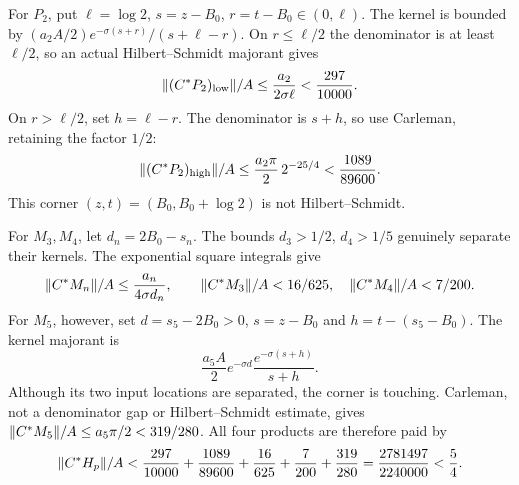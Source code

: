 \documentclass[11pt,a4paper]{article}
\numberwithin{equation}{section}
\theoremstyle{definition}\newtheorem{definition}[theorem]{Definition}
\theoremstyle{remark}\newtheorem{remark}[theorem]{Remark}
\begin{document}
For $P_2$, put $\ell=\log2$, $s=z-{B_0}$, $r=t-{B_0}\in(0,\ell)$.
The kernel is bounded by
$(a_2A/2)e^{-\sigma(s+r)}/(s+\ell-r)$.
On $r\le\ell/2$ the denominator is at least $\ell/2$, so an actual Hilbert--Schmidt majorant gives
\[
 \lVert(C^*P_2)_{\rm low}\rVert/A
 \le\frac{a_2}{2\sigma\ell}<\frac{297}{10000}.
\]
On $r>\ell/2$, set $h=\ell-r$. The denominator is $s+h$, so use Carleman, retaining the factor $1/2$:
\[
 \lVert(C^*P_2)_{\rm high}\rVert/A
 \le\frac{a_2\pi}{2}\,2^{-25/4}<\frac{1089}{89600}.
\]
This corner $(z,t)=({B_0},{B_0}+\log2)$ is not Hilbert--Schmidt.

For $M_3,M_4$, let $d_n=2{B_0}-s_n$. The bounds
$d_3>1/2$, $d_4>1/5$ genuinely separate their kernels.
The exponential square integrals give
\[
 \lVert C^*M_n\rVert/A\le\frac{a_n}{4\sigma d_n},\qquad
 \lVert C^*M_3\rVert/A<16/625,\quad \lVert C^*M_4\rVert/A<7/200.
\]
For $M_5$, however, set $d=s_5-2{B_0}>0$,
$s=z-{B_0}$ and $h=t-(s_5-{B_0})$.
The kernel majorant is
\[
 \frac{a_5A}{2}e^{-\sigma d}\frac{e^{-\sigma(s+h)}}{s+h}.
\]
Although its two input locations are separated, the corner is touching.
Carleman, not a denominator gap or Hilbert--Schmidt estimate, gives
$\lVert C^*M_5\rVert/A\le a_5\pi/2<319/280$.
All four products are therefore paid by
\begin{equation}\label{c:eq:CHp}
 \lVert C^*H_p\rVert/A<
 \frac{297}{10000}+\frac{1089}{89600}+\frac{16}{625}
 +\frac7{200}+\frac{319}{280}
 =\frac{2781497}{2240000}<\frac54.
\end{equation}
\end{document}
